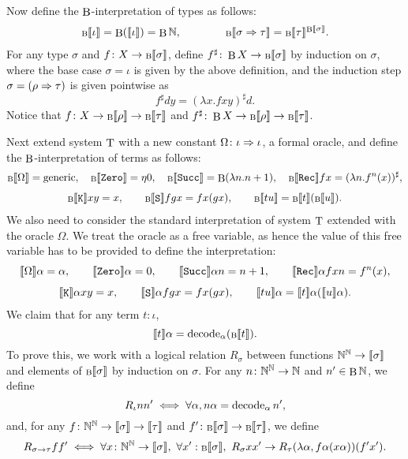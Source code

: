 \documentclass{entcs} \usepackage{prentcsmacro}
\begin{document}
Now define the $\B$-interpretation of types as follows:
\begin{gather*}
\binterp{\iota}  = \B(\interp{\iota}) = \B \N, \qquad
\qquad \binterp{\sigma \To \tau} =  \binterp{\tau}^{\binterp{\sigma}}.
\end{gather*}
For any type $\sigma$ and $f \colon X \to \binterp{\sigma}$, define
$f^\sharp \colon \B X \to \binterp{\sigma}$ by induction on $\sigma$,
where the base case $\sigma = \iota$ is given by the above definition,
and the induction step $\sigma = (\rho \To \tau)$ is given pointwise as
\[
f^\sharp d y = (\lambda x. f x y)^\sharp d.
\]
Notice that $f \colon X \to \binterp{\rho} \to \binterp{\tau}$ and
$f^\sharp \colon \B X \to \binterp{\rho} \to \binterp{\tau}$.

Next extend system $\T$ with a new constant $\Omega \colon \iota \To
\iota$, a formal oracle, and define the $\B$-interpretation of terms
as follows:
\begin{gather*}
\binterp{\Omega} = \generic,
\quad \binterp{\Zero} = \eta 0,
\quad \binterp{\Succ} = \B(\lambda n.n+1),
\quad \binterp{\Rec}  f x = (\lambda n.f^n(x))^\sharp, \\[1ex]
\binterp{\K} x y = x,
\qquad \binterp{\SS} f g x = fx(gx),
\qquad \binterp{tu} = \binterp{t}(\binterp{u}).
\end{gather*}
We also need to consider the standard interpretation of system $\T$
extended with the oracle $\Omega$. We treat the oracle as a free
variable, as hence the value of this free variable has to be provided
to define the interpretation:
\begin{gather*}
\interp{\Omega} \alpha = \alpha,
\qquad \interp{\Zero} \alpha = 0,
\qquad \interp{\Succ} \alpha n = n+1,
\qquad \interp{\Rec} \alpha f x n  = f^n(x), \\[1ex]
\interp{\K} \alpha x y = x,
\qquad \interp{\SS} \alpha f g x = fx(gx),
\qquad \interp{tu} \alpha  = \interp{t}\alpha (\interp{u} \alpha).
\end{gather*}
We claim that for any term $t \colon \iota$,
\[
  \interp{t} \alpha = \decode_\alpha (\binterp{t}).
\]
To prove this, we work with a logical relation $R_\sigma$ between 
functions $\N^\N \to \interp{\sigma}$ and elements of 
$\binterp{\sigma}$ by induction on $\sigma$.
For any $n \colon \N^\N \to \N$ and $n' \in \B \N$, we define
\[ R_\iota n n' \iff \forall \alpha, n \alpha = \decode_\alpha n', \]
and, for any $f \colon \N^\N \to \interp{\sigma} \to \interp{\tau}$ 
and $f' \colon \binterp{\sigma} \to \binterp{\tau}$, we define
\[ R_{\sigma \to \tau} f f' \iff 
  \forall x \colon \N^\N \to \interp{\sigma}, \,\, \forall x' : \binterp{\sigma}, \,\, R_{\sigma} x x' \to R_\tau (\lambda \alpha, f \alpha (x \alpha)) (f' x').\]
\end{document}
